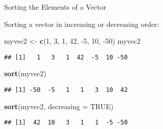 \documentclass[ignorenonframetext,]{beamer}
\newenvironment{Shaded}{\begin{snugshade}}{\end{snugshade}}
\newcommand{\DataTypeTok}[1]{\textcolor[rgb]{0.13,0.29,0.53}{#1}}
\newcommand{\DecValTok}[1]{\textcolor[rgb]{0.00,0.00,0.81}{#1}}
\newcommand{\KeywordTok}[1]{\textcolor[rgb]{0.13,0.29,0.53}{\textbf{#1}}}
\newcommand{\NormalTok}[1]{#1}
\newcommand{\OtherTok}[1]{\textcolor[rgb]{0.56,0.35,0.01}{#1}}
\newcommand{\StringTok}[1]{\textcolor[rgb]{0.31,0.60,0.02}{#1}}
\begin{document}
\begin{frame}[fragile]{Sorting the Elements of a Vector}
\protect\hypertarget{sorting-the-elements-of-a-vector}{}

Sorting a vector in increasing or decreasing order:

\begin{Shaded}
\begin{Highlighting}[]
\NormalTok{myvec2 <-}\StringTok{ }\KeywordTok{c}\NormalTok{(}\DecValTok{1}\NormalTok{, }\DecValTok{3}\NormalTok{, }\DecValTok{1}\NormalTok{, }\DecValTok{42}\NormalTok{, }\DecValTok{-5}\NormalTok{, }\DecValTok{10}\NormalTok{, }\DecValTok{-50}\NormalTok{)}
\NormalTok{myvec2}
\end{Highlighting}
\end{Shaded}

\begin{verbatim}
## [1]   1   3   1  42  -5  10 -50
\end{verbatim}

\begin{Shaded}
\begin{Highlighting}[]
\KeywordTok{sort}\NormalTok{(myvec2)}
\end{Highlighting}
\end{Shaded}

\begin{verbatim}
## [1] -50  -5   1   1   3  10  42
\end{verbatim}

\begin{Shaded}
\begin{Highlighting}[]
\KeywordTok{sort}\NormalTok{(myvec2, }\DataTypeTok{decreasing =} \OtherTok{TRUE}\NormalTok{)}
\end{Highlighting}
\end{Shaded}

\begin{verbatim}
## [1]  42  10   3   1   1  -5 -50
\end{verbatim}

\end{frame}
\end{document}
